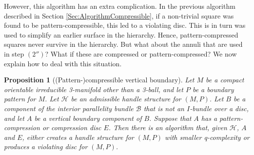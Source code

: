 \documentclass[oneside]{amsart}
\numberwithin{equation}{section}
\theoremstyle{plain}
\newtheorem{proposition}[equation]{Proposition}
\theoremstyle{definition}
\newcommand{\calH}{\mathcal{H}}
\newcommand{\calB}{\mathcal{B}}
\begin{document}
However, this algorithm has an extra complication. In the previous algorithm described in Section \ref{Sec:AlgorithmCompressible}, if a non-trivial square was found to be pattern-compressible, this led to a violating disc. This is in turn was used to simplify an earlier surface in the hierarchy. Hence, pattern-compressed squares never survive in the hierarchy. But what about the annuli that are used in step $(2'')$? What if these are compressed or pattern-compressed? We now explain how to deal with this situation.

\begin{proposition}[{\sc (Pattern-)compressible vertical boundary}]
\label{Prop:CompressAnnuli}
Let $M$ be a compact orientable irreducible 3-manifold other than a 3-ball, and let $P$ be a boundary pattern for $M$. Let $\mathcal{H}$ be an admissible handle structure for $(M,P)$. Let $B$ be a component of the interior parallelity bundle $\calB$ that is not an $I$-bundle over a disc, and let $A$ be a vertical boundary component of $B$. Suppose that $A$ has a pattern-compression or compression disc $E$. Then there is an algorithm that, given $\calH$, $A$ and $E$, either creates a handle structure for $(M,P)$ with smaller q-complexity or produces a violating disc for $(M,P)$.
\end{proposition}
\end{document}
